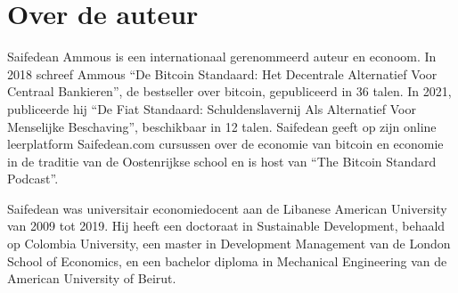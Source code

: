 \documentclass[smalldemyvopaper,10pt,twoside,onecolumn,openright,extrafontsizes]{memoir}
\begin{document}
\setcounter{footnote}{0}
\clearpage

\paragraph{}
\paragraph{}
\paragraph{}
\paragraph{}
\begin{center}
\itshape\large{}
\end{center}
\cleardoublepage
\normalfont

\pagestyle{mystyle}

\tableofcontents*


\chapter{Over de auteur}
Saifedean Ammous is een internationaal gerenommeerd auteur en econoom. In 2018 schreef Ammous \enquote{De Bitcoin Standaard: Het Decentrale Alternatief Voor Centraal Bankieren}, de bestseller over bitcoin, gepubliceerd in 36 talen. In 2021, publiceerde hij \enquote{De Fiat Standaard: Schuldenslavernij Als Alternatief Voor Menselijke Beschaving}, beschikbaar in 12 talen. Saifedean geeft op zijn online leerplatform Saifedean.com cursussen over de economie van bitcoin en economie in de traditie van de Oostenrijkse school en is host van \enquote{The Bitcoin Standard Podcast}.

Saifedean was universitair economiedocent aan de Libanese American University van 2009 tot 2019. Hij heeft een doctoraat in Sustainable Development, behaald op Colombia University, een master in Development Management van de London School of Economics, en een bachelor diploma in Mechanical Engineering van de American University of Beirut.



\mainmatter
\end{document}
